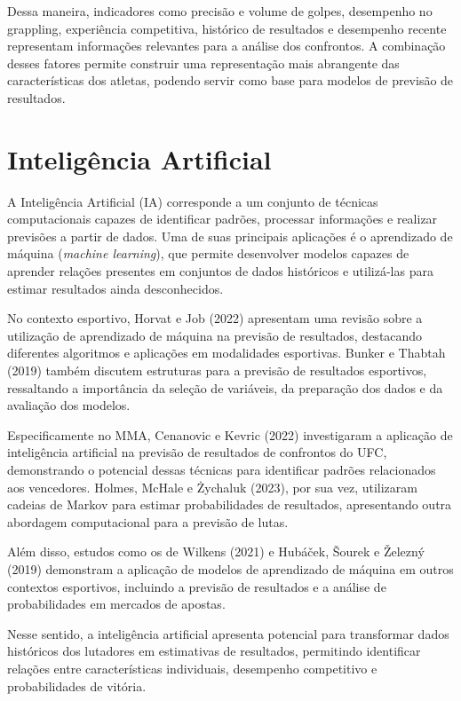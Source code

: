 \documentclass[12pt,a4paper]{report}
\begin{document}
Dessa maneira, indicadores como precisão e volume de golpes, desempenho no grappling, experiência competitiva, histórico de resultados e desempenho recente representam informações relevantes para a análise dos confrontos. A combinação desses fatores permite construir uma representação mais abrangente das características dos atletas, podendo servir como base para modelos de previsão de resultados.

\section{Inteligência Artificial}

A Inteligência Artificial (IA) corresponde a um conjunto de técnicas computacionais capazes de identificar padrões, processar informações e realizar previsões a partir de dados. Uma de suas principais aplicações é o aprendizado de máquina (\textit{machine learning}), que permite desenvolver modelos capazes de aprender relações presentes em conjuntos de dados históricos e utilizá-las para estimar resultados ainda desconhecidos.

No contexto esportivo, Horvat e Job (2022) apresentam uma revisão sobre a utilização de aprendizado de máquina na previsão de resultados, destacando diferentes algoritmos e aplicações em modalidades esportivas. Bunker e Thabtah (2019) também discutem estruturas para a previsão de resultados esportivos, ressaltando a importância da seleção de variáveis, da preparação dos dados e da avaliação dos modelos.

Especificamente no MMA, Cenanovic e Kevric (2022) investigaram a aplicação de inteligência artificial na previsão de resultados de confrontos do UFC, demonstrando o potencial dessas técnicas para identificar padrões relacionados aos vencedores. Holmes, McHale e Żychaluk (2023), por sua vez, utilizaram cadeias de Markov para estimar probabilidades de resultados, apresentando outra abordagem computacional para a previsão de lutas.

Além disso, estudos como os de Wilkens (2021) e Hubáček, Šourek e Železný (2019) demonstram a aplicação de modelos de aprendizado de máquina em outros contextos esportivos, incluindo a previsão de resultados e a análise de probabilidades em mercados de apostas.

Nesse sentido, a inteligência artificial apresenta potencial para transformar dados históricos dos lutadores em estimativas de resultados, permitindo identificar relações entre características individuais, desempenho competitivo e probabilidades de vitória.
\end{document}
